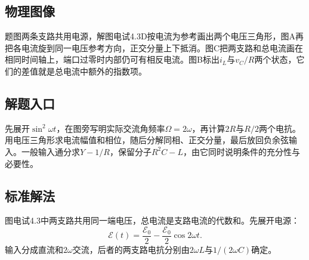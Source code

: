 \documentclass[UTF8,fontset=fandol,a4paper,11pt]{ctexart}
\begin{document}


\subsection*{物理图像}

题图两条支路共用电源，解图电试4.3D按电流为参考画出两个电压三角形，图A再把各电流旋到同一电压参考方向，正交分量上下抵消。图C把两支路和总电流画在相同时间轴上，端口过零时内部仍可有相反电流。图B标出$i_L$与$v_C/R$两个状态，它们的差值就是总电流中额外的指数项。



\subsection*{解题入口}

先展开$\sin^2\omega t$，在图旁写明实际交流角频率$\Omega=2\omega$，再计算$2R$与$R/2$两个电抗。用电压三角形求电流幅值和相位，随后分解同相、正交分量，最后放回负余弦输入。一般输入通分求$Y-1/R$，保留分子$R^2C-L$，由它同时说明条件的充分性与必要性。



\subsection*{标准解法}


图电试4.3中两支路共用同一端电压，总电流是支路电流的代数和。先展开电源：
\[
\mathcal E(t)=\frac{\mathcal E_0}{2}
-\frac{\mathcal E_0}{2}\cos2\omega t.
\]
输入分成直流和$2\omega$交流，后者的两支路电抗分别由$2\omega L$与$1/(2\omega C)$确定。
\end{document}
